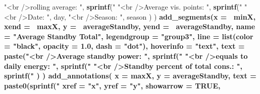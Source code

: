 \documentclass[
  a4paperpaper,
]{book}
\newenvironment{Shaded}{\begin{snugshade}}{\end{snugshade}}
\newcommand{\DataTypeTok}[1]{\textcolor[rgb]{0.13,0.29,0.53}{#1}}
\newcommand{\DecValTok}[1]{\textcolor[rgb]{0.00,0.00,0.81}{#1}}
\newcommand{\FloatTok}[1]{\textcolor[rgb]{0.00,0.00,0.81}{#1}}
\newcommand{\KeywordTok}[1]{\textcolor[rgb]{0.13,0.29,0.53}{\textbf{#1}}}
\newcommand{\NormalTok}[1]{#1}
\newcommand{\OperatorTok}[1]{\textcolor[rgb]{0.81,0.36,0.00}{\textbf{#1}}}
\newcommand{\OtherTok}[1]{\textcolor[rgb]{0.56,0.35,0.01}{#1}}
\newcommand{\StringTok}[1]{\textcolor[rgb]{0.31,0.60,0.02}{#1}}
\let\oldShaded\Shaded
\let\endoldShaded\endShaded
\renewenvironment{Shaded}{\footnotesize\oldShaded}{\endoldShaded}
\begin{document}
\begin{Shaded}
\begin{Highlighting}[]
{{{{{{{{{{{{{{{{{{{{{{{{{{{{{{{{{{{{{{{{{{{{{{{{{{{{{{{{{{{{{{{{{{{{                           \StringTok{"<br />rolling average:        "}\NormalTok{, }\KeywordTok{sprintf}\NormalTok{(}\StringTok{"%
                           \StringTok{"<br />Average vis. points: "}\NormalTok{, }\KeywordTok{sprintf}\NormalTok{(}\StringTok{"%
                           \StringTok{"<br />Date:                        "}\NormalTok{, day,}
                           \StringTok{"<br />Season:                   "}\NormalTok{, season}
\NormalTok{            )}
\NormalTok{  ) }\OperatorTok{%
\StringTok{  }\KeywordTok{add_segments}\NormalTok{(}\DataTypeTok{x =} \OperatorTok{~}\NormalTok{minX,}
               \DataTypeTok{xend =} \OperatorTok{~}\NormalTok{maxX,}
               \DataTypeTok{y =} \OperatorTok{~}\NormalTok{averageStandby,}
               \DataTypeTok{yend =} \OperatorTok{~}\NormalTok{averageStandby,}
               \DataTypeTok{name =} \StringTok{"Average Standby Total"}\NormalTok{,}
               \DataTypeTok{legendgroup =} \StringTok{"group3"}\NormalTok{,}
               \DataTypeTok{line =} \KeywordTok{list}\NormalTok{(}\DataTypeTok{color =} \StringTok{"black"}\NormalTok{, }\DataTypeTok{opacity =} \FloatTok{1.0}\NormalTok{, }\DataTypeTok{dash =} \StringTok{"dot"}\NormalTok{),}
               \DataTypeTok{hoverinfo =} \StringTok{"text"}\NormalTok{,}
               \DataTypeTok{text =} \OperatorTok{~}\StringTok{ }\KeywordTok{paste}\NormalTok{(}\StringTok{"<br />Average standby power:          "}\NormalTok{, }\KeywordTok{sprintf}\NormalTok{(}\StringTok{"%
                              \StringTok{"<br />equals to daily energy:         "}\NormalTok{, }\KeywordTok{sprintf}\NormalTok{(}\StringTok{"%
                              \StringTok{"<br />Standby percent of total cons.: "}\NormalTok{, }\KeywordTok{sprintf}\NormalTok{(}\StringTok{"%
\NormalTok{               )}
\NormalTok{  ) }\OperatorTok{%
\StringTok{  }\KeywordTok{add_annotations}\NormalTok{(}
    \DataTypeTok{x =}\NormalTok{ maxX,}
    \DataTypeTok{y =}\NormalTok{ averageStandby,}
    \DataTypeTok{text =} \KeywordTok{paste0}\NormalTok{(}\KeywordTok{sprintf}\NormalTok{(}\StringTok{"%
    \DataTypeTok{xref =} \StringTok{"x"}\NormalTok{,}
    \DataTypeTok{yref =} \StringTok{"y"}\NormalTok{,}
    \DataTypeTok{showarrow =} \OtherTok{TRUE}\NormalTok{,}
}}}}}}}}}}}}}}}}}}}}}}}}}}}}}}}}}}}}}}}}}}}}}}}}}}}}}}}}}}}}}}}}}}}}}}}}}}}}
\end{Highlighting}
\end{Shaded}
\end{document}
